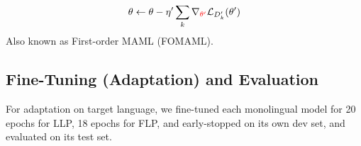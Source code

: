\begin{equation}
  \theta \leftarrow \theta - \eta^\prime \sum_k \nabla_{\textcolor{red}{\theta^\prime}} \mathcal{L}_{D^\prime_k}(\theta^\prime)
\end{equation}
Also known as First-order MAML (FOMAML).

\subsection{Fine-Tuning (Adaptation) and Evaluation}
For adaptation on target language, we fine-tuned each monolingual model for 20 epochs for LLP, 18 epochs for FLP, and early-stopped on its own dev set, and evaluated on its test set. 

